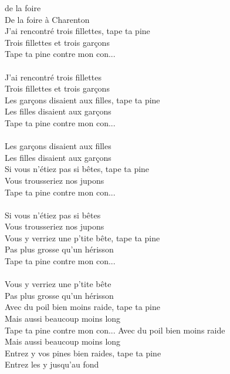 
 de la foire
\\De la foire à Charenton
\\J'ai rencontré trois fillettes, tape ta pine
\\Trois fillettes et trois garçons
\\Tape ta pine contre mon con...
\\\\J'ai rencontré trois fillettes
\\Trois fillettes et trois garçons
\\Les garçons disaient aux filles, tape ta pine
\\Les filles disaient aux garçons
\\Tape ta pine contre mon con...
\\\\Les garçons disaient aux filles
\\Les filles disaient aux garçons
\\Si vous n'étiez pas si bêtes, tape ta pine
\\Vous trousseriez nos jupons
\\Tape ta pine contre mon con...
\\\\Si vous n'étiez pas si bêtes
\\Vous trousseriez nos jupons
\\Vous y verriez une p'tite bête, tape ta pine
\\Pas plus grosse qu'un hérisson
\\Tape ta pine contre mon con...
\\\\Vous y verriez une p'tite bête
\\Pas plus grosse qu'un hérisson
\\Avec du poil bien moins raide, tape ta pine
\\Mais aussi beaucoup moins long
\\Tape ta pine contre mon con...
\breakpage
Avec du poil bien moins raide
\\Mais aussi beaucoup moins long
\\Entrez y vos pines bien raides, tape ta pine
\\Entrez les y jusqu'au fond
